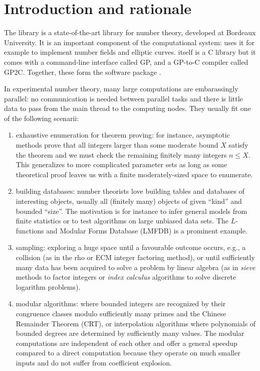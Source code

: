 \documentclass{deliverablereport}
\author{Bill Allombert, Karim Belabas}
\begin{document}
\maketitle
\githubissuedescription
\tableofcontents

\section{Introduction and rationale}

The \Pari library is a state-of-the-art library for number theory,
developed at Bordeaux University. It is an important component of the \Sage
computational system: \Sage uses it for example to implement number fields
and elliptic curves. \Pari itself is a C library but it comes with a
command-line interface called GP, and a GP-to-C compiler called GP2C.
Together, these form the software package \PariGP.

In experimental number theory, many large computations are embarassingly
parallel: no communication is needed between parallel tasks and there is
little data to pass from the main thread to the computing nodes. They usually
fit one of the following scenarii:
\begin{enumerate}
  \item exhaustive enumeration for theorem proving: for instance, asymptotic
    methods prove that all integers larger than some moderate bound $X$
    satisfy the theorem and we must check the remaining finitely many
    integers $n \leq X$. This generalizes to more complicated parameter sets
    as long as some theoretical proof leaves us with a finite
    moderately-sized space to enumerate.

  \item building databases: number theorists love building tables and
    databases of interesting objects, usually all (finitely many) objects
    of given ``kind'' and bounded ``size''. The motivation is for instance
    to infer general models from finite statistics or to test algorithms on
    large unbiased data sets. The $L$-functions and Modular Forms Database
    (LMFDB) is a prominent example.
    
  \item sampling: exploring a huge space until a favourable outcome occurs,
    e.g., a collision (as in the rho or ECM integer factoring method), or
    until sufficiently many data has been acquired to solve a problem by
    linear algebra (as in \emph{sieve} methods to factor integers or
    \emph{index calculus} algorithms to solve discrete logarithm problems).
    
  \item modular algorithms: where bounded integers are recognized by their
    congruence classes modulo sufficiently many primes and the Chinese
    Remainder Theorem (CRT), or interpolation algorithms where polynomials of
    bounded degrees are determined by sufficiently many values. The modular
    computations are independent of each other and offer a general speedup
    compared to a direct computation because they operate on much smaller 
    inputs and do not suffer from coefficient explosion.
\end{enumerate}
\end{document}
